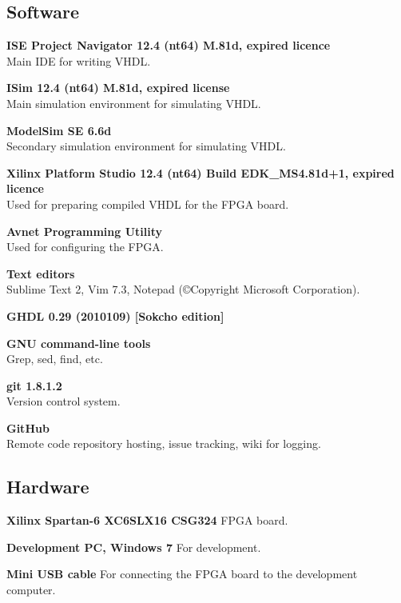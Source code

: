 
\subsection{Software}
\begin{description}
    \item{\textbf{ISE Project Navigator 12.4 (nt64) M.81d, expired licence}} \\
        Main IDE for writing VHDL.
    \item{\textbf{ISim 12.4 (nt64) M.81d, expired license}} \\
        Main simulation environment for simulating VHDL.
    \item{\textbf{ModelSim SE 6.6d}} \\
        Secondary simulation environment for simulating VHDL.
    \item{\textbf{Xilinx Platform Studio 12.4 (nt64) Build EDK\_MS4.81d+1, expired licence}} \\
        Used for preparing compiled VHDL for the FPGA board.
    \item{\textbf{Avnet Programming Utility}} \\
        Used for configuring the FPGA.
    \item{\textbf{Text editors}} \\
        Sublime Text 2, Vim 7.3, Notepad (©Copyright Microsoft Corporation).
    \item{\textbf{GHDL 0.29 (2010109) [Sokcho edition]}} \\

    \item{\textbf{GNU command-line tools}} \\
        Grep, sed, find, etc.
    \item{\textbf{git 1.8.1.2}} \\
        Version control system.
    \item{\textbf{GitHub}} \\
        Remote code repository hosting, issue tracking, wiki for logging.
\end{description}

\subsection{Hardware}
\begin{description}
\item{\textbf{Xilinx Spartan-6 XC6SLX16 CSG324}}
    FPGA board.
\item{\textbf{Development PC, Windows 7}}
    For development.
\item{\textbf{Mini USB cable}}
    For connecting the FPGA board to the development computer.
\end{description}


